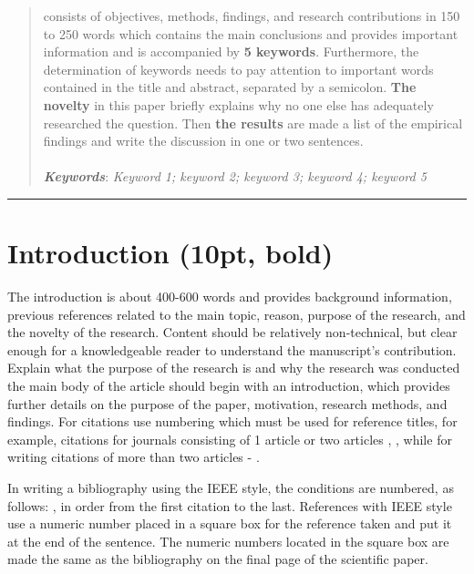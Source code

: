 \documentclass{article}
\begin{document}
\begin{abstract}
		consists of objectives, methods, findings, and research contributions in 150 to 250 words which contains the main conclusions and provides important information and is accompanied by \textbf{5 keywords}. Furthermore, the determination of keywords needs to pay attention to important words contained in the title and abstract, separated by a semicolon. \textbf{The novelty} in this paper briefly explains why no one else has adequately researched the question. Then \textbf{the results} are made a list of the empirical findings and write the discussion in one or two sentences. \\ \\
		\let\thefootnote\relax{}
		\textbf{\textit{Keywords}}: \textit{Keyword 1; keyword 2; keyword 3; keyword 4; keyword 5}
	\end{abstract}
\noindent\rule{15cm}{0.4pt}

\section{Introduction (10pt, bold)}
The introduction is about 400-600 words and provides background information, previous references related to the main topic, reason, purpose of the research, and the novelty of the research.  Content should be relatively non-technical, but clear enough for a knowledgeable reader to understand the manuscript’s contribution. Explain what the purpose of the research is and why the research was conducted the main body of the article should begin with an introduction, which provides further details on the purpose of the paper, motivation, research methods, and findings. For citations use numbering which must be used for reference titles, for example, citations for journals consisting of 1 article  \cite{Septiawan1} or two articles \cite{Septiawan2}, \cite{Lucy}, while for writing citations of more than two articles \cite{Gingold} - \cite{Morikawa}.

In writing a bibliography using the IEEE style, the conditions are numbered, as follows: \cite{Septiawan1}, in order from the first citation to the last. References with IEEE style use a numeric number placed in a square box for the reference taken and put it at the end of the sentence. The numeric numbers located in the square box are made the same as the bibliography on the final page of the scientific paper.
\end{document}
